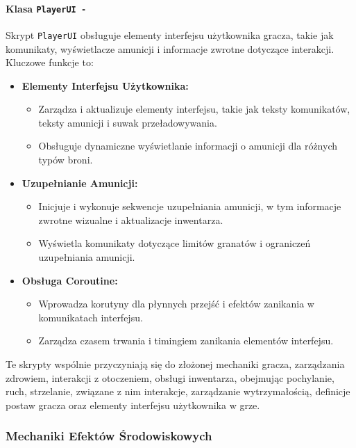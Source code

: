 \paragraph{Klasa \texttt{PlayerUI -}}
Skrypt \texttt{PlayerUI} obsługuje elementy interfejsu użytkownika gracza, takie jak komunikaty, wyświetlacze amunicji i informacje zwrotne dotyczące interakcji. Kluczowe funkcje to:
\begin{itemize}
  \item \textbf{Elementy Interfejsu Użytkownika:}
    \begin{itemize}
      \item Zarządza i aktualizuje elementy interfejsu, takie jak teksty komunikatów, teksty amunicji i suwak przeładowywania.
      \item Obsługuje dynamiczne wyświetlanie informacji o amunicji dla różnych typów broni.
    \end{itemize}
  \item \textbf{Uzupełnianie Amunicji:}
    \begin{itemize}
      \item Inicjuje i wykonuje sekwencje uzupełniania amunicji, w tym informacje zwrotne wizualne i aktualizacje inwentarza.
      \item Wyświetla komunikaty dotyczące limitów granatów i ograniczeń uzupełniania amunicji.
    \end{itemize}
  \item \textbf{Obsługa Coroutine:}
    \begin{itemize}
      \item Wprowadza korutyny dla płynnych przejść i efektów zanikania w komunikatach interfejsu.
      \item Zarządza czasem trwania i timingiem zanikania elementów interfejsu.
    \end{itemize}
\end{itemize}

Te skrypty wspólnie przyczyniają się do złożonej mechaniki gracza, zarządzania zdrowiem, interakcji z otoczeniem, obsługi inwentarza, obejmując pochylanie, ruch, strzelanie, związane z nim interakcje, zarządzanie wytrzymałością, definicje postaw gracza oraz elementy interfejsu użytkownika w grze.

\subsubsection{Mechaniki Efektów Środowiskowych}

